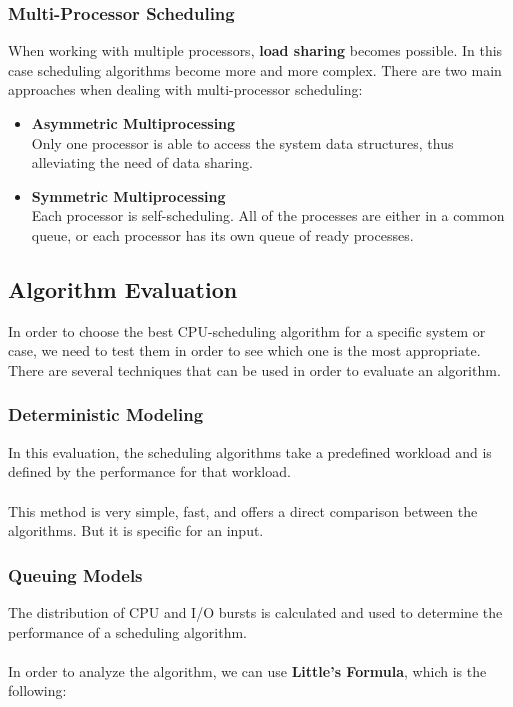 \documentclass{article}
\begin{document}
\subsubsection{Multi-Processor Scheduling}
When working with multiple processors, \textbf{load sharing} becomes possible. In this case scheduling algorithms become more and more complex. There are two main approaches when dealing with multi-processor scheduling:

\begin{itemize}
	\item \textbf{Asymmetric Multiprocessing}
	\vspace{.2cm} \\
	Only one processor is able to access the system data structures, thus alleviating the need of data sharing.
	
	\item \textbf{Symmetric Multiprocessing}
	\vspace{.2cm} \\
	Each processor is self-scheduling. All of the processes are either in a common queue, or each processor has its own queue of ready processes.
\end{itemize}

\subsection{Algorithm Evaluation}
In order to choose the best CPU-scheduling algorithm for a specific system or case, we need to test them in order to see which one is the most appropriate. There are several techniques that can be used in order to evaluate an algorithm.

\subsubsection{Deterministic Modeling}
In this evaluation, the scheduling algorithms take a predefined workload and is defined by the performance for that workload. \\ \\
This method is very simple, fast, and offers a direct comparison between the algorithms. But it is specific for an input.

\subsubsection{Queuing Models}
The distribution of CPU and I/O bursts is calculated and used to determine the performance of a scheduling algorithm. \\ \\
In order to analyze the algorithm, we can use \textbf{Little's Formula}, which is the following:
\end{document}
